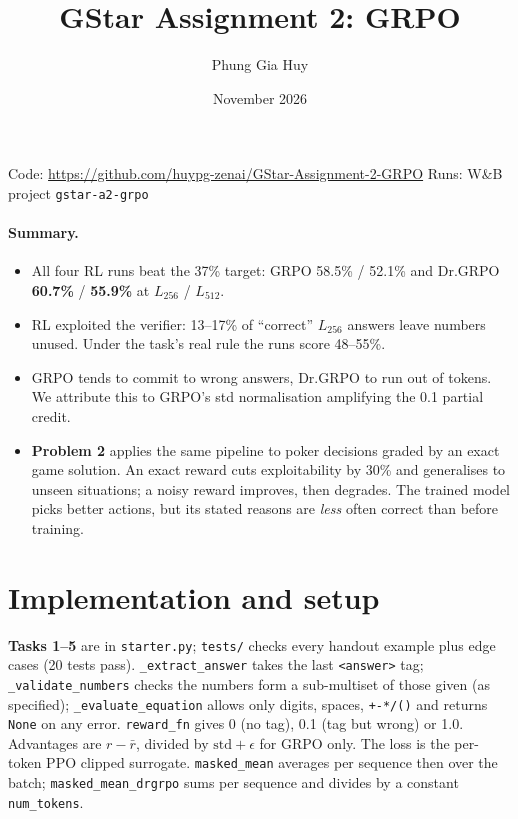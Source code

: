 \documentclass[10.5pt]{article}
\title{\textbf{GStar Assignment 2: GRPO}}
\author{Phung Gia Huy}
\date{November 2026}
\newcommand{\code}[1]{\texttt{#1}}
\begin{document}
\maketitle
\vspace{-10pt}
\begin{center}\small
Code: \url{https://github.com/huypg-zenai/GStar-Assignment-2-GRPO} \quad Runs: W\&B project \code{gstar-a2-grpo}
\end{center}

\paragraph{Summary.}
\begin{itemize}
\item All four RL runs beat the 37\% target: GRPO 58.5\% / 52.1\% and Dr.GRPO \textbf{60.7\%} / \textbf{55.9\%} at
  $L_{256}$ / $L_{512}$.
\item RL exploited the verifier: 13--17\% of ``correct'' $L_{256}$ answers leave numbers unused. Under the task's
  real rule the runs score 48--55\%.
\item GRPO tends to commit to wrong answers, Dr.GRPO to run out of tokens. We attribute this to GRPO's std
  normalisation amplifying the 0.1 partial credit.
\item \textbf{Problem 2} applies the same pipeline to poker decisions graded by an exact game solution. An exact reward cuts
  exploitability by 30\% and generalises to unseen situations; a noisy reward improves, then degrades. The trained
  model picks better actions, but its stated reasons are \emph{less} often correct than before training.
\end{itemize}

\section{Implementation and setup}
\textbf{Tasks 1--5} are in \code{starter.py}; \code{tests/} checks every handout example plus edge cases (20 tests pass).
\code{\_extract\_answer} takes the last \code{<answer>} tag; \code{\_validate\_numbers} checks the numbers form a
sub-multiset of those given (as specified); \code{\_evaluate\_equation} allows only digits, spaces, \code{+-*/()} and
returns \code{None} on any error. \code{reward\_fn} gives 0 (no tag), 0.1 (tag but wrong) or 1.0. Advantages are
$r-\bar r$, divided by $\mathrm{std}+\epsilon$ for GRPO only. The loss is the per-token PPO clipped surrogate.
\code{masked\_mean} averages per sequence then over the batch; \code{masked\_mean\_drgrpo} sums per sequence and
divides by a constant \code{num\_tokens}.
\end{document}
